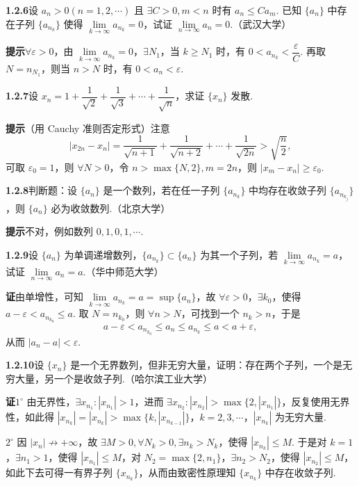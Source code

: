 \documentclass[UTF8,12pt,a4paper,fontset=fandol]{ctexart}
\begin{document}
\noindent\textbf{1.2.6}\quad 设 $a_n>0(n=1,2,\cdots)$ 且 $\exists C>0,m<n$ 时有 $a_n\le Ca_m$. 已知 $\{a_n\}$ 中存在子列 $\{a_{n_k}\}$ 使得 $\lim\limits_{k\to\infty}a_{n_k}=0$，试证 $\lim\limits_{n\to\infty}a_n=0$.（武汉大学）

\noindent\textbf{提示}\quad $\forall\varepsilon>0$，由 $\lim\limits_{k\to\infty}a_{n_k}=0$，$\exists N_1$，当 $k\ge N_1$ 时，有 $0<a_{n_k}<\dfrac{\varepsilon}{C}$. 再取 $N=n_{N_1}$，则当 $n>N$ 时，有 $0<a_n<\varepsilon$.

\noindent\textbf{1.2.7}\quad 设 $x_n=1+\dfrac1{\sqrt2}+\dfrac1{\sqrt3}+\cdots+\dfrac1{\sqrt n}$，求证 $\{x_n\}$ 发散.

\noindent\textbf{提示}\quad （用 Cauchy 准则否定形式）注意
\[
  |x_{2n}-x_n|=\frac1{\sqrt{n+1}}+\frac1{\sqrt{n+2}}+\cdots+\frac1{\sqrt{2n}}
  >\sqrt{\frac n2},
\]
可取 $\varepsilon_0=1$，则 $\forall N>0$，令 $n>\max\{N,2\},m=2n$，则 $|x_m-x_n|\ge\varepsilon_0$.

\noindent\textbf{1.2.8}\quad 判断题：设 $\{a_n\}$ 是一个数列，若在任一子列 $\{a_{n_k}\}$ 中均存在收敛子列 $\{a_{n_{k_j}}\}$，则 $\{a_n\}$ 必为收敛数列.（北京大学）

\noindent\textbf{提示}\quad 不对，例如数列 $0,1,0,1,\cdots$.

\noindent\textbf{1.2.9}\quad 设 $\{a_n\}$ 为单调递增数列，$\{a_{n_k}\}\subset\{a_n\}$ 为其一个子列，若 $\lim\limits_{k\to\infty}a_{n_k}=a$，试证 $\lim\limits_{n\to\infty}a_n=a$.（华中师范大学）

\noindent\textbf{证}\quad 由单增性，可知 $\lim\limits_{k\to\infty}a_{n_k}=a=\sup\{a_n\}$，故 $\forall\varepsilon>0$，$\exists k_0$，使得 $a-\varepsilon<a_{n_{k_0}}\le a$. 取 $N=n_{k_0}$，则 $\forall n>N$，可找到一个 $n_k>n$，于是
\[
  a-\varepsilon<a_{n_{k_0}}\le a_n\le a_{n_k}\le a<a+\varepsilon,
\]
从而 $|a_n-a|<\varepsilon$.

\noindent\textbf{1.2.10}\quad 设 $\{x_n\}$ 是一个无界数列，但非无穷大量，证明：存在两个子列，一个是无穷大量，另一个是收敛子列.（哈尔滨工业大学）

\noindent\textbf{证}\quad $1^\circ$ 由无界性，$\exists x_{n_1}:|x_{n_1}|>1$，进而 $\exists x_{n_2}:|x_{n_2}|>\max\{2,|x_{n_1}|\}$，反复使用无界性，如此得 $|x_{n_k}|=|x_{n_k}|>\max\{k,|x_{n_{k-1}}|\}$，$k=2,3,\cdots$，$|x_{n_k}|$ 为无穷大量.

$2^\circ$ 因 $|x_n|\not\to+\infty$，故 $\exists M>0,\forall N_k>0,\exists n_k>N_k$，使得 $|x_{n_k}|\le M$. 于是对 $k=1$，$\exists n_1>1$，使得 $|x_{n_1}|\le M$，对 $N_2=\max\{2,n_1\}$，$\exists n_2>N_2$，使得 $|x_{n_2}|\le M$，如此下去可得一有界子列 $\{x_{n_k}\}$，从而由致密性原理知 $\{x_{n_k}\}$ 中存在收敛子列.
\end{document}
